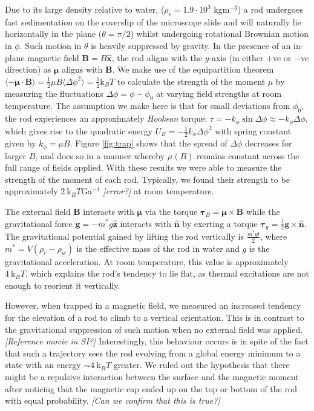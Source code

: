\documentclass[aps,prl,twocolumn,superscriptaddress]{revtex4-1}
\newcommand{\vcrm}[1]{\mathbf{#1}}
\newcommand{\hvcrm}[1]{\mathbf{\hat{#1}}}
\newcommand{\vc}[1]{\boldsymbol{#1}}
\newcommand{\kk}{\mathrm{k}_B}
\begin{document}
Due to its large density relative to water, ($\rho_r = 1.9 \cdot 10^3$ kgm$^{-3}$) a rod undergoes fast sedimentation on the coverslip of the microscope slide and will naturally lie horizontally in the plane ($\theta=\pi/2$) whilst undergoing rotational Brownian motion in $\phi$. Such motion in $\theta$ is heavily suppressed by gravity. In the presence of an in-plane magnetic field $\vcrm{B}=B\hvcrm{x}$, the rod aligns with the $y$-axis (in either $+$ve or $-$ve direction) as $\vc{\mu}$ aligns with $\vcrm{B}$. We make use of the equipartition theorem $\langle -\vc{\mu}\cdot\vcrm{B}\rangle = \frac{1}{2}\mu B \langle \Delta\phi^2 \rangle = \frac{1}{2}\kk T$ to calculate the strength of the moment $\mu$ by measuring the fluctuations $\Delta\phi=\phi-\phi_0$ at varying field strengths at room temperature. The assumption we make here is that for small deviations from $\phi_0$, the rod experiences an approximately \emph{Hookean} torque: $\tau = -k_\phi \sin{\Delta\phi}\approx-k_\phi\Delta\phi$, which gives rise to the quadratic energy $U_B=-\frac{1}{2}k_\phi \Delta\phi^2$ with spring constant given by $k_\phi=\mu B$. Figure \ref{fig:trap} shows that the spread of $\Delta\phi$ decreases for larger $B$, and does so in a manner whereby $\mu(B)$ remains constant across the full range of fields applied. With these results we were able to measure the strength of the moment of each rod. Typically, we found their strength to be approximately $ 2 \ \kk T$Ga$^{-1}$ \emph{[error?]} at room temperature.

The external field $\vcrm{B}$ interacts with $\vc{\mu}$ via the torque $\vc{\tau}_B = \vc{\mu}\times\vcrm{B}$ while the gravitational force $\vcrm{g}=-m^*g\hvcrm{z}$ interacts with $\hvcrm{n}$ by exerting a torque $\vc{\tau}_g=\frac{l}{2}\vcrm{g}\times\hvcrm{n}$. The gravitational potential gained by lifting the rod vertically is $\frac{m^* g l}{2}$, where $m^* = V(\rho_r - \rho_w)$ is the effective mass of the rod in water and $g$ is the gravitational acceleration. At room temperature, this value is approximately $4\ \kk  T$, which explains the rod's tendency to lie flat, as thermal excitations are not enough to reorient it vertically. 

However, when trapped in a magnetic field, we measured an increased tendency for the elevation of a rod to climb to a vertical orientation. This is in contrast to the gravitational suppression of such motion when no external field was applied. \emph{[Reference movie in SI?]} Interestingly, this behaviour occurs is in spite of the fact that such a trajectory sees the rod evolving from a global energy minimum to a state with an energy $\sim 4\ \kk T$ greater. We ruled out the hypothesis that there might be a repulsive interaction between the surface and the magnetic moment after noticing that the magnetic cap ended up on the top or bottom of the rod with equal probability. \emph{[Can we confirm that this is true?]}
\end{document}
